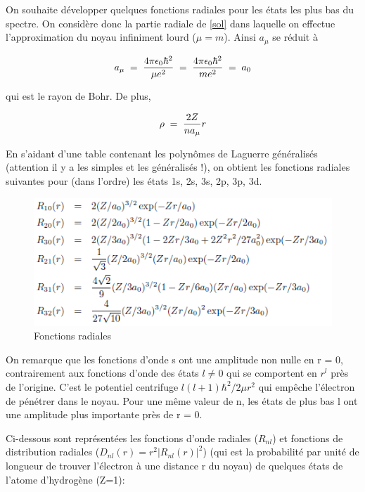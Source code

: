 On souhaite développer quelques fonctions radiales pour les états les plus bas du spectre. On considère donc la partie radiale de \eqref{sol} dans laquelle on effectue l'approximation du noyau infiniment lourd ($\mu=m$). Ainsi $a_\mu$ se réduit à 

\begin{equation*}
    a_{\mu}\; = \; \dfrac{4\pi\epsilon_0\hbar^2}{\mu e^2}\; = \; \dfrac{4\pi\epsilon_0\hbar^2}{me^2}\; = \;  a_0
\end{equation*}

qui est le rayon de Bohr. De plus,

\begin{equation*}
    \rho\; = \; \dfrac{2Z}{n a_{\mu}}r    
\end{equation*}

En s'aidant d'une table contenant les polynômes de Laguerre généralisés (attention il y a les simples et les généralisés !), on obtient les fonctions radiales suivantes pour (dans l'ordre) les états 1s, 2s, 3s, 2p, 3p, 3d.

\begin{figure}[tph]
    \centering
    \includegraphics{Images2/foncrad.PNG}
    \caption{Fonctions radiales}
    \label{fig:foncrad}
\end{figure}


On remarque que les fonctions d'onde s ont une amplitude non nulle en r = 0, contrairement aux fonctions
d'onde des états $l\neq 0$ qui se comportent en $r^l$ près de l'origine. C'est le potentiel centrifuge $l(l+1)\hbar^2/2\mu r^2$ qui empêche l'électron de pénétrer dans le noyau. Pour une même valeur de n, les états de plus bas l ont une amplitude plus importante près de r = 0.

\vspace{0.2cm}

Ci-dessous sont représentées les fonctions d'onde radiales ($R_{nl}$) et fonctions de distribution radiales ($D_{nl}(r)=r^2|R_{nl}(r)|^2$) (qui est la probabilité par unité de longueur de trouver l'électron à une distance r du noyau) de quelques états de l'atome d'hydrogène (Z=1):

